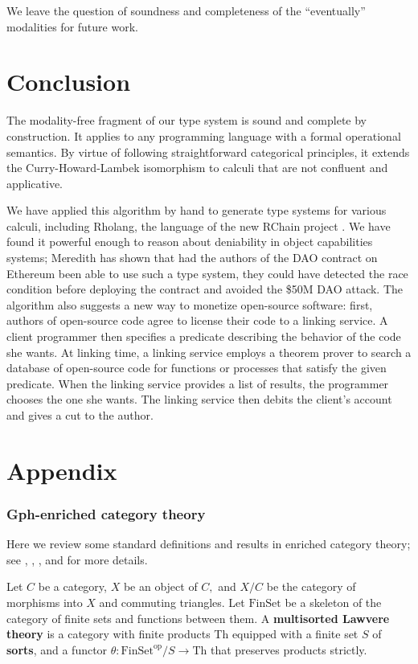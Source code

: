 \documentclass[submission,copyright,creativecommons]{eptcs}
\newcommand{\maps}{\colon}
\newcommand{\Th}{\mathrm{Th}}
\newcommand{\FinSet}{\mathrm{FinSet}}
\newcommand{\op}{\mathrm{op}}
\begin{document}
We leave the question of soundness and completeness of the ``eventually'' modalities for future work.

\section{Conclusion}

The modality-free fragment of our type system is sound and complete by construction.  It applies to any programming language with a formal operational semantics.  By virtue of following straightforward categorical principles, it extends the Curry-Howard-Lambek isomorphism to calculi that are not confluent and applicative.

We have applied this algorithm by hand to generate type systems for various calculi, including Rholang, the language of the new RChain project \cite{Rholang}.  We have found it powerful enough to reason about deniability in object capabilities systems; Meredith \cite{GregDAO} has shown that had the authors of the DAO contract on Ethereum been able to use such a type system, they could have detected the race condition before deploying the contract and avoided the \$50M DAO attack.  The algorithm also suggests a new way to monetize open-source software: first, authors of open-source code agree to license their code to a linking service.  A client programmer then specifies a predicate describing the behavior of the code she wants.  At linking time, a linking service employs a theorem prover to search a database of open-source code for functions or processes that satisfy the given predicate.  When the linking service provides a list of results, the programmer chooses the one she wants.  The linking service then debits the client's account and gives a cut to the author.

\section{Appendix}
\subsubsection{Gph-enriched category theory}
\label{GphReview}

Here we review some standard definitions and results in enriched category theory; see \cite{CIS-335497}, \cite{Power99EnrichedLawvereTheories}, \cite{LackR11}, and \cite{Trimble} for more details.

Let $C$ be a category, $X$ be an object of $C,$ and $X/C$ be the category of morphisms into $X$ and commuting triangles.  Let $\FinSet$ be a skeleton of the category of finite sets and functions between them.  A {\bf multisorted Lawvere theory} is a category with finite products Th equipped with a finite set $S$ of {\bf sorts}, and a functor $\theta\maps \FinSet^{\op}/S \to \Th$ that preserves products strictly.
\end{document}
